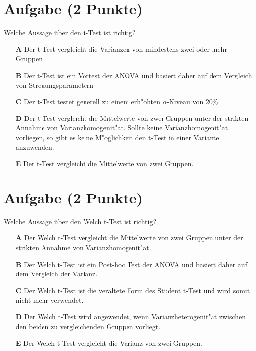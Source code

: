 \documentclass[a4paper, 10pt]{scrartcl}\usepackage[]{graphicx}\usepackage[]{xcolor}
\begin{document}
\section{Aufgabe \hfill (2 Punkte)}

Welche Aussage {\"u}ber den t-Test ist richtig?



\begin{enumerate}
\item [\textbf{A} \msquare] Der t-Test vergleicht die Varianzen von mindestens zwei oder mehr Gruppen
\item [\textbf{B} \msquare] Der t-Test ist ein Vortest der ANOVA und basiert daher auf dem Vergleich von Streuungsparametern
\item [\textbf{C} \msquare] Der t-Test testet generell zu einem erh{"o}hten $\alpha$-Niveau von 20\%.
\item [\textbf{D} \msquare] Der t-Test vergleicht die Mittelwerte von zwei Gruppen unter der strikten Annahme von Varianzhomogenit{"a}t. Sollte keine Varianzhomogenit{"a}t vorliegen, so gibt es keine M{"o}glichkeit den t-Test in einer Variante anzuwenden.
\item [\textbf{E} \msquare] Der t-Test vergleicht die Mittelwerte von zwei Gruppen.
\end{enumerate}

\section{Aufgabe \hfill (2 Punkte)}

Welche Aussage {\"u}ber den Welch t-Test ist richtig?



\begin{enumerate}
\item [\textbf{A} \msquare] Der Welch t-Test vergleicht die Mittelwerte von zwei Gruppen unter der strikten Annahme von Varianzhomogenit{"a}t.
\item [\textbf{B} \msquare] Der Welch t-Test ist ein Post-hoc Test der ANOVA und basiert daher auf dem Vergleich der Varianz.
\item [\textbf{C} \msquare] Der Welch t-Test ist die veraltete Form des Student t-Test und wird somit nicht mehr verwendet.
\item [\textbf{D} \msquare] Der Welch t-Test wird angewendet, wenn Varianzheterogenit{"a}t zwischen den beiden zu vergleichenden Gruppen vorliegt.
\item [\textbf{E} \msquare] Der Welch t-Test vergleicht die Varianz von zwei Gruppen.
\end{enumerate}
\end{document}
